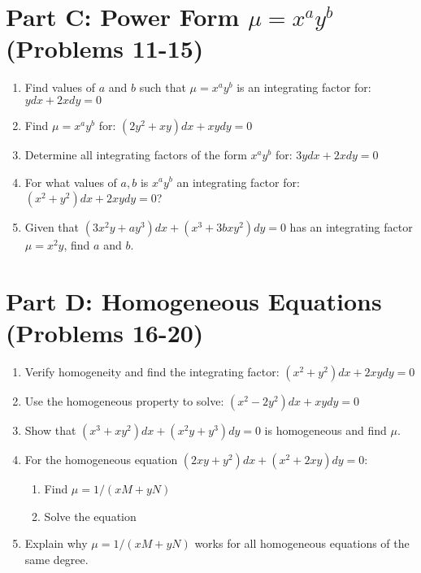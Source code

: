 \documentclass[12pt]{article}
\begin{document}
\section*{Part C: Power Form $\mu = x^a y^b$ (Problems 11-15)}

\begin{enumerate}[start=11]
\item Find values of $a$ and $b$ such that $\mu = x^a y^b$ is an integrating factor for:
$y dx + 2x dy = 0$

\item Find $\mu = x^a y^b$ for: $(2y^2 + xy)dx + xy dy = 0$

\item Determine all integrating factors of the form $x^a y^b$ for:
$3y dx + 2x dy = 0$

\item For what values of $a, b$ is $x^a y^b$ an integrating factor for:
$(x^2 + y^2)dx + 2xy dy = 0$?

\item Given that $(3x^2y + ay^3)dx + (x^3 + 3bxy^2)dy = 0$ has an integrating factor $\mu = x^2y$, find $a$ and $b$.
\end{enumerate}

\section*{Part D: Homogeneous Equations (Problems 16-20)}

\begin{enumerate}[start=16]
\item Verify homogeneity and find the integrating factor:
$(x^2 + y^2)dx + 2xy dy = 0$

\item Use the homogeneous property to solve:
$(x^2 - 2y^2)dx + xy dy = 0$

\item Show that $(x^3 + xy^2)dx + (x^2y + y^3)dy = 0$ is homogeneous and find $\mu$.

\item For the homogeneous equation $(2xy + y^2)dx + (x^2 + 2xy)dy = 0$:
\begin{enumerate}[label=(\alph*)]
    \item Find $\mu = 1/(xM + yN)$
    \item Solve the equation
\end{enumerate}

\item Explain why $\mu = 1/(xM + yN)$ works for all homogeneous equations of the same degree.
\end{enumerate}
\end{document}
